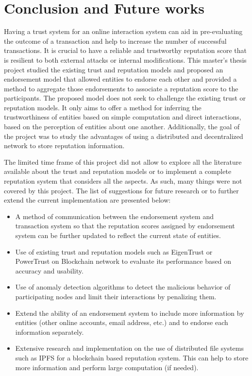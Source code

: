 \chapter{Conclusion and Future works} \label{ch:conclusion}
Having a trust system for an online interaction system can aid in
pre-evaluating the outcome of a transaction and help to increase the number of
successful transactions. It is crucial to have a reliable and trustworthy
reputation score that is resilient to both external attacks or internal
modifications. This master's thesis project studied the existing trust and
reputation models and proposed an endorsement model that allowed entities to
endorse each other and provided a method to aggregate those endorsements to
associate a reputation score to the participants. The proposed model does not
seek to challenge the existing trust or reputation models. It only aims to
offer a method for inferring the trustworthiness of entities based on simple
computation and direct interactions, based on the perception of entities about
one another. Additionally, the goal of the project was to study the advantages
of using a distributed and decentralized network to store reputation
information.  \par
The limited time frame of this project did not allow to explore all the literature available about the trust and reputation models or to implement a complete reputation system that considers all the aspects. As such, many things were not covered by this project. The list of suggestions for future research or to further extend the current implementation are presented below: 
\begin{itemize}
	\item A method of communication between the endorsement system and
	transaction system so that the reputation scores assigned by endorsement
	system can be further updated to reflect the current state of entities. 
	\item Use of existing trust and reputation models such as EigenTrust or
	PowerTrust on Blockchain network to evaluate its performance based on
	accuracy and usability.
	\item Use of anomaly detection algorithms to detect the malicious behavior
	of participating nodes and limit their interactions by penalizing them. 
	\item Extend the ability of an endorsement system to include more
	information by entities (other online accounts, email address, etc.) and to
	endorse each information separately. 
	\item Extensive research and implementation on the use of distributed file
	systems such as IPFS for a blockchain based reputation system. This can
	help to store more information and perform large computation (if needed). 
\end{itemize}
